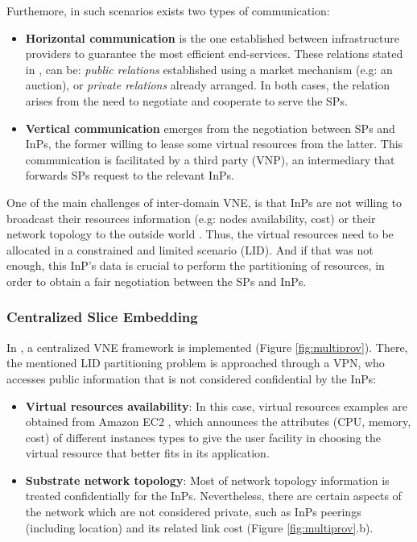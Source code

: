 Furthemore, in such scenarios exists two types of communication:

\begin{itemize}	
	\item \textbf{Horizontal communication} is the one established between infrastructure providers to guarantee the most efficient end-services. These relations stated in \citep{zaheer2010multi}, can be: \textit{public relations} established using a market mechanism (e.g: an auction), or \textit{private relations} already arranged. In both cases, the relation arises from the need to negotiate and cooperate to serve the SPs.
	\item \textbf{Vertical communication} emerges from the negotiation between SPs and InPs, the former willing to lease some virtual resources from the latter. This communication is facilitated by a third party (VNP), an intermediary that forwards SPs request to the relevant InPs.
\end{itemize}

One of the main challenges of inter-domain VNE, is that InPs are not willing to broadcast their resources information (e.g: nodes availability, cost) or their network topology to the outside world \citep{dietrich2015multi}. Thus, the virtual resources need to be allocated in a constrained and limited scenario (LID). And if that was not enough, this InP's data is crucial to perform the partitioning of resources, in order to obtain a fair negotiation between the SPs and InPs.

\subsubsection{Centralized Slice Embedding}

In \citep{dietrich2015multi}, a centralized VNE framework is implemented (Figure \ref{fig:multiprov}). There, the mentioned LID partitioning problem is approached through a VPN, who accesses public information that is not considered confidential by the InPs:

\begin{itemize}
	\item \textbf{Virtual resources availability}: In this case, virtual resources examples are obtained from Amazon EC2 \cite{amazonEC2}, which announces the attributes (CPU, memory, cost) of different instances types to give the user facility in choosing the virtual resource that better fits in its application.
	\item \textbf{Substrate network topology}: Most of network topology information is treated confidentially for the InPs. Nevertheless, there are certain aspects of the network which are not considered private, such as InPs peerings (including location) and its related link cost (Figure \ref{fig:multiprov}.b).
\end{itemize}

